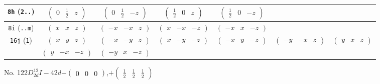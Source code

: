 \documentclass[fleqn,9pt,landscape]{jsarticle}
\begin{document}
\begin{center}
\begin{longtable}{ccccccc}
{\tt 8h} ({\tt 2..}) & $ \begin{pmatrix} 0 & \frac{1}{2} & z \end{pmatrix} $ & $ \begin{pmatrix} 0 & \frac{1}{2} & - z \end{pmatrix} $ & $ \begin{pmatrix} \frac{1}{2} & 0 & z \end{pmatrix} $ & $ \begin{pmatrix} \frac{1}{2} & 0 & - z \end{pmatrix} $ & $  $ & $  $ \\ \hline
{\tt 8i} ({\tt ..m}) & $ \begin{pmatrix} x & x & z \end{pmatrix} $ & $ \begin{pmatrix} - x & - x & z \end{pmatrix} $ & $ \begin{pmatrix} x & - x & - z \end{pmatrix} $ & $ \begin{pmatrix} - x & x & - z \end{pmatrix} $ & $  $ & $  $ \\ \hline
{\tt 16j} ({\tt 1}) & $ \begin{pmatrix} x & y & z \end{pmatrix} $ & $ \begin{pmatrix} - x & - y & z \end{pmatrix} $ & $ \begin{pmatrix} x & - y & - z \end{pmatrix} $ & $ \begin{pmatrix} - x & y & - z \end{pmatrix} $ & $ \begin{pmatrix} - y & - x & z \end{pmatrix} $ & $ \begin{pmatrix} y & x & z \end{pmatrix} $ \\
& $ \begin{pmatrix} y & - x & - z \end{pmatrix} $ & $ \begin{pmatrix} - y & x & - z \end{pmatrix} $ & $  $ & $  $ & $  $ & $  $ \\
\end{longtable}
\end{center}
\newpage
No. 122\quad$D_{2d}^{12}$\quad$I-42d$\quad[ tetragonal ]\quad$+\begin{pmatrix} 0 & 0 & 0 \end{pmatrix}$,\quad $+\begin{pmatrix} \frac{1}{2} & \frac{1}{2} & \frac{1}{2} \end{pmatrix}$
\end{document}
